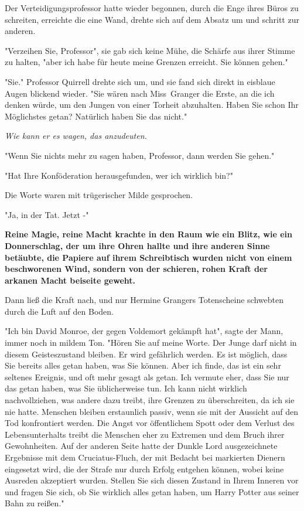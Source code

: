 {Der Verteidigungsprofessor hatte wieder begonnen, durch die Enge ihres Büros zu schreiten, erreichte die eine Wand, drehte sich auf dem Absatz um und schritt zur anderen.

"Verzeihen Sie, Professor", sie gab sich keine Mühe, die Schärfe aus ihrer Stimme zu halten, "aber ich habe für heute meine Grenzen erreicht. Sie können gehen."

"Sie." Professor Quirrell drehte sich um, und sie fand sich direkt in eisblaue Augen blickend wieder. "Sie wären nach Miss~Granger die Erste, an die ich denken würde, um den Jungen von einer Torheit abzuhalten. Haben Sie schon Ihr Möglichstes getan? Natürlich haben Sie das nicht."

\emph{Wie kann er es wagen, das anzudeuten.}

"Wenn Sie nichts mehr zu sagen haben, Professor, dann werden Sie gehen."

"Hat Ihre Konföderation herausgefunden, wer ich wirklich bin?"

Die Worte waren mit trügerischer Milde gesprochen.

"Ja, in der Tat. Jetzt -"

\textbf{Reine Magie, reine Macht krachte in den Raum wie ein Blitz, wie ein Donnerschlag, der um ihre Ohren hallte und ihre anderen Sinne betäubte, die Papiere auf ihrem Schreibtisch wurden nicht von einem beschworenen Wind, sondern von der schieren, rohen Kraft der arkanen Macht beiseite geweht.}

Dann ließ die Kraft nach, und nur Hermine Grangers Totenscheine schwebten durch die Luft auf den Boden.

"Ich bin David Monroe, der gegen Voldemort gekämpft hat", sagte der Mann, immer noch in mildem Ton. "Hören Sie auf meine Worte. Der Junge darf nicht in diesem Geisteszustand bleiben. Er wird gefährlich werden. Es ist möglich, dass Sie bereits alles getan haben, was Sie können. Aber ich finde, das ist ein sehr seltenes Ereignis, und oft mehr gesagt als getan. Ich vermute eher, dass Sie nur das getan haben, was Sie üblicherweise tun. Ich kann nicht wirklich nachvollziehen, was andere dazu treibt, ihre Grenzen zu überschreiten, da ich sie nie hatte. Menschen bleiben erstaunlich passiv, wenn sie mit der Aussicht auf den Tod konfrontiert werden. Die Angst vor öffentlichem Spott oder dem Verlust des Lebensunterhalts treibt die Menschen eher zu Extremen und dem Bruch ihrer Gewohnheiten. Auf der anderen Seite hatte der Dunkle Lord ausgezeichnete Ergebnisse mit dem Cruciatus-Fluch, der mit Bedacht bei markierten Dienern eingesetzt wird, die der Strafe nur durch Erfolg entgehen können, wobei keine Ausreden akzeptiert wurden. Stellen Sie sich diesen Zustand in Ihrem Inneren vor und fragen Sie sich, ob Sie wirklich alles getan haben, um Harry Potter aus seiner Bahn zu reißen."

}
